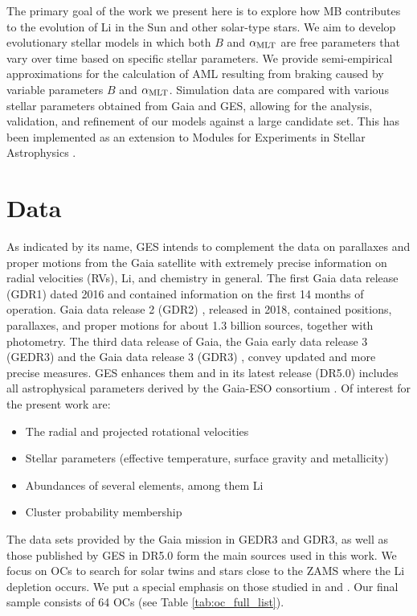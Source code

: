 \documentclass[fleqn,usenatbib]{mnras}
\begin{document}
The primary goal of the work we present here is to explore how MB contributes to the evolution of Li in the Sun and other solar-type stars. We aim to develop evolutionary stellar models in which both $B$ and $\alpha_{\mathrm{MLT}}$ are free parameters that vary over time based on specific stellar parameters. We provide semi-empirical approximations for the calculation of AML resulting from braking caused by variable parameters $B$ and $\alpha_{\mathrm{MLT}}$. Simulation data are compared with various stellar parameters obtained from Gaia and GES, allowing for the analysis, validation, and refinement of our models against a large candidate set. This has been implemented as an extension to Modules for Experiments in Stellar Astrophysics \citep[MESA; ][]{Paxton2011, Paxton2013,Paxton2015, Paxton2018, Paxton2019}.\par

\section{Data} \label{sec_data}
As indicated by its name, GES intends to complement the data on parallaxes and proper motions from the Gaia satellite \citep{Mignard2005} with extremely precise information on radial velocities (RVs), Li, and chemistry in general. The first Gaia data release (GDR1) \citep{Brown2016} dated 2016 and contained information on the first 14 months of operation. Gaia data release 2 (GDR2) \citep{Brown2018}, released in 2018, contained positions, parallaxes, and proper motions for about 1.3 billion sources, together with photometry. The third data release of Gaia, the Gaia early data release 3 (GEDR3) \citep{Brown2021} and the Gaia data release 3 (GDR3) \citep{Brown2022}, convey updated and more precise measures. GES enhances them and in its latest release (DR5.0) includes all astrophysical parameters derived by the Gaia-ESO consortium \citep{Gilmore2022}. Of interest for the present work are:
\begin{itemize}
    \item The radial and projected rotational velocities
    \item Stellar parameters (effective temperature, surface gravity and metallicity)
    \item Abundances of several elements, among them Li
    \item Cluster probability membership
\end{itemize}

The data sets provided by the Gaia mission in GEDR3 and GDR3, as well as those published by GES in DR5.0 form the main sources used in this work. We focus on OCs to search for solar twins and stars close to the ZAMS where the Li depletion occurs.  We put a special  emphasis on those studied in \citet{Bragaglia2022} and \citet{Randich2022}. Our final sample consists of 64 OCs (see Table \ref{tab:oc_full_list}).
\end{document}
